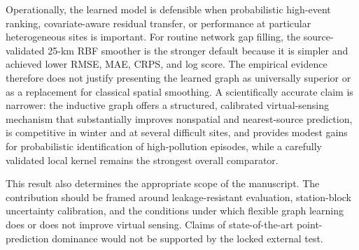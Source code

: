 Operationally, the learned model is defensible when probabilistic high-event ranking, covariate-aware residual transfer, or performance at particular heterogeneous sites is important. For routine network gap filling, the source-validated 25-km RBF smoother is the stronger default because it is simpler and achieved lower RMSE, MAE, CRPS, and log score. The empirical evidence therefore does not justify presenting the learned graph as universally superior or as a replacement for classical spatial smoothing. A scientifically accurate claim is narrower: the inductive graph offers a structured, calibrated virtual-sensing mechanism that substantially improves nonspatial and nearest-source prediction, is competitive in winter and at several difficult sites, and provides modest gains for probabilistic identification of high-pollution episodes, while a carefully validated local kernel remains the strongest overall comparator.

This result also determines the appropriate scope of the manuscript. The contribution should be framed around leakage-resistant evaluation, station-block uncertainty calibration, and the conditions under which flexible graph learning does or does not improve virtual sensing. Claims of state-of-the-art point-prediction dominance would not be supported by the locked external test.
